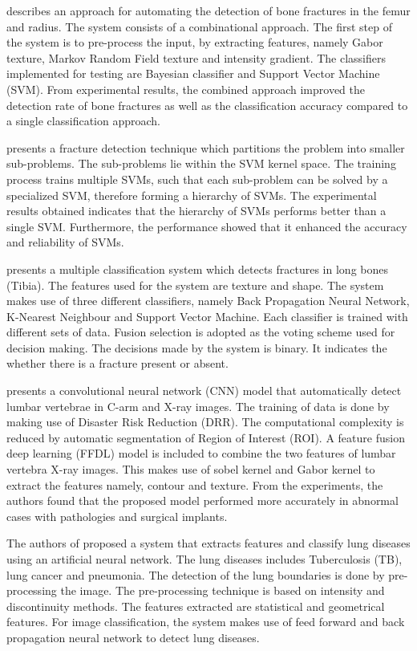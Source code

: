 \documentclass[11pt]{article}
\begin{document}
	\cite{lim2004detection} describes an approach for automating the detection of bone fractures in the femur and radius. The system consists of a combinational approach. The first step of the system is to pre-process the input, by extracting features, namely Gabor texture, Markov Random Field texture and intensity gradient. The classifiers implemented for testing are Bayesian classifier and Support Vector Machine (SVM). From experimental results, the combined approach improved the detection rate of bone fractures as well as the classification accuracy compared to a single classification approach.
	
	\cite{JoshuaCongfuHe2007} presents a fracture detection technique which partitions the problem into smaller sub-problems. The sub-problems lie within the SVM kernel space. The training process trains multiple SVMs, such that each sub-problem can be solved by a specialized SVM, therefore forming a hierarchy of SVMs. The experimental results obtained indicates that the hierarchy of SVMs performs better than a single SVM. Furthermore, the performance showed that it enhanced the accuracy and reliability of SVMs.
	
	\cite{multiple_classification} presents a multiple classification system which detects fractures in long bones (Tibia). The features used for the system are texture and shape. The system makes use of three different classifiers, namely Back Propagation Neural Network, K-Nearest Neighbour and Support Vector Machine. Each classifier is trained with different sets of data. Fusion selection is adopted as the voting scheme used for decision making. The decisions made by the system is binary. It indicates the whether there is a fracture present or absent.
	
	\cite{Li_Liang2016} presents a convolutional neural network (CNN) model that automatically detect lumbar vertebrae in C-arm and X-ray images. The training of data is done by making use of Disaster Risk Reduction (DRR). The computational complexity is reduced by automatic segmentation of Region of Interest (ROI). A feature fusion deep learning (FFDL) model is included to combine the two features of lumbar vertebra X-ray images. This makes use of sobel kernel and Gabor kernel to extract the features namely, contour and texture. From the experiments, the authors found that the proposed model performed more accurately in abnormal cases with pathologies and surgical implants. 
	
	The authors of \cite{Pune2016} proposed a system that extracts features and classify lung diseases using an artificial neural network. The lung diseases includes Tuberculosis (TB), lung cancer and pneumonia. The detection of the lung boundaries is done by pre-processing the image. The pre-processing technique is based on intensity and discontinuity methods. The features extracted are statistical and geometrical features. For image classification, the system makes use of feed forward and back propagation neural network to detect lung diseases.
	
\end{document}
